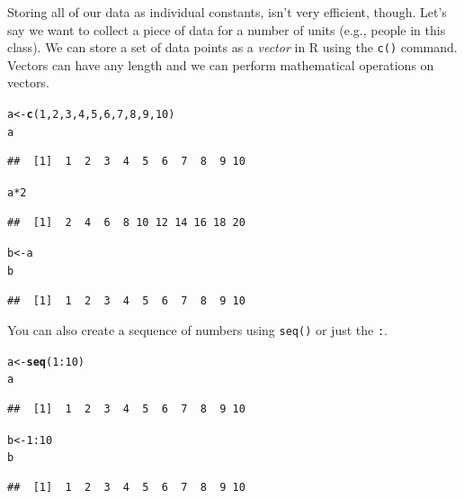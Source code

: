 \documentclass[12pt]{article}\usepackage[]{graphicx}\usepackage[]{color}
\makeatletter
\newcommand{\hlnum}[1]{\textcolor[rgb]{0.686,0.059,0.569}{#1}}%
\newcommand{\hlopt}[1]{\textcolor[rgb]{0,0,0}{#1}}%
\newcommand{\hlstd}[1]{\textcolor[rgb]{0.345,0.345,0.345}{#1}}%
\newcommand{\hlkwb}[1]{\textcolor[rgb]{0.69,0.353,0.396}{#1}}%
\newcommand{\hlkwd}[1]{\textcolor[rgb]{0.737,0.353,0.396}{\textbf{#1}}}%
\newenvironment{kframe}{%
 \def\at@end@of@kframe{}%
 \ifinner\ifhmode%
  \def\at@end@of@kframe{\end{minipage}}%
  \begin{minipage}{\columnwidth}%
 \fi\fi%
 \def\FrameCommand##1{\hskip\@totalleftmargin \hskip-\fboxsep
 \colorbox{shadecolor}{##1}\hskip-\fboxsep
     \hskip-\linewidth \hskip-\@totalleftmargin \hskip\columnwidth}%
 \MakeFramed {\advance\hsize-\width
   \@totalleftmargin\z@ \linewidth\hsize
   \@setminipage}}%
 {\par\unskip\endMakeFramed%
 \at@end@of@kframe}
\newenvironment{knitrout}{}{} %
\makeatother
\begin{document}
Storing all of our data as individual constants, isn't very efficient, though. Let's say we want to collect a piece of data for a number of units (e.g., people in this class). We can store a set of data points as a \emph{vector} in R using the \texttt{c()} command. Vectors can have any length and we can perform mathematical operations on vectors.

\begin{knitrout}
\color{fgcolor}\begin{kframe}
\begin{alltt}
\hlstd{a} \hlkwb{<-} \hlkwd{c}\hlstd{(}\hlnum{1}\hlstd{,}\hlnum{2}\hlstd{,}\hlnum{3}\hlstd{,}\hlnum{4}\hlstd{,}\hlnum{5}\hlstd{,}\hlnum{6}\hlstd{,}\hlnum{7}\hlstd{,}\hlnum{8}\hlstd{,}\hlnum{9}\hlstd{,}\hlnum{10}\hlstd{)}
\hlstd{a}
\end{alltt}
\begin{verbatim}
##  [1]  1  2  3  4  5  6  7  8  9 10
\end{verbatim}
\begin{alltt}
\hlstd{a}\hlopt{*}\hlnum{2}
\end{alltt}
\begin{verbatim}
##  [1]  2  4  6  8 10 12 14 16 18 20
\end{verbatim}
\begin{alltt}
\hlstd{b} \hlkwb{<-} \hlstd{a}
\hlstd{b}
\end{alltt}
\begin{verbatim}
##  [1]  1  2  3  4  5  6  7  8  9 10
\end{verbatim}
\end{kframe}
\end{knitrout}

You can also create a sequence of numbers using \texttt{seq()} or just the \texttt{:}.
\begin{knitrout}
\color{fgcolor}\begin{kframe}
\begin{alltt}
\hlstd{a} \hlkwb{<-} \hlkwd{seq}\hlstd{(}\hlnum{1}\hlopt{:}\hlnum{10}\hlstd{)}
\hlstd{a}
\end{alltt}
\begin{verbatim}
##  [1]  1  2  3  4  5  6  7  8  9 10
\end{verbatim}
\begin{alltt}
\hlstd{b} \hlkwb{<-} \hlnum{1}\hlopt{:}\hlnum{10}
\hlstd{b}
\end{alltt}
\begin{verbatim}
##  [1]  1  2  3  4  5  6  7  8  9 10
\end{verbatim}
\end{kframe}
\end{knitrout}
\end{document}
